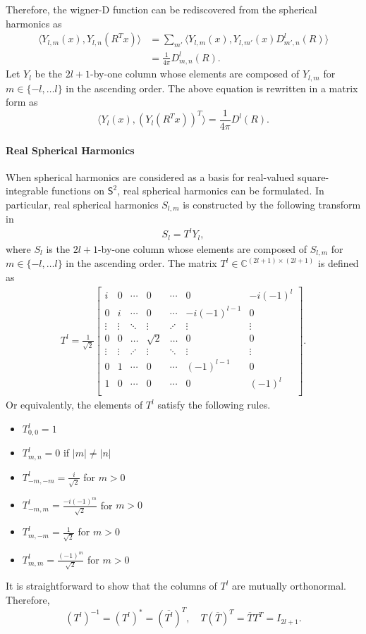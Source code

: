 \documentclass[onecolumn,11pt]{IEEEtran}
\newcommand{\pair}[1]{\ensuremath{\langle #1 \rangle}}
\newcommand{\Cp}{\ensuremath{\mathbb{C}}}
\newcommand{\Sph}{\ensuremath{\mathsf{S}}}
\begin{document}
Therefore, the wigner-D function can be rediscovered from the spherical harmonics as
\begin{align*}
    \pair{Y_{l,m}(x), Y_{l,n}(R^T x) } &= \sum_{m'} \pair{Y_{l,m}(x), Y_{l,m'}(x) D^l_{m',n}(R) }\\
    & = \frac{1}{4\pi} D^l_{m,n}(R).
\end{align*}
Let $Y_l$ be the $2l+1$-by-one column whose elements are composed of $Y_{l,m}$ for $m\in\{-l,\ldots l\}$ in the ascending order. 
The above equation is rewritten in a matrix form as
\[
    \pair{ Y_l(x), (Y_l(R^Tx))^T } = \frac{1}{4\pi} D^l(R).
\]

\paragraph{Real Spherical Harmonics}

When spherical harmonics are considered as a basis for real-valued square-integrable functions on $\Sph^2$, real spherical harmonics can be formulated. 
In particular, real spherical harmonics $S_{l,m}$ is constructed by the following transform in~\cite{BlaFloJMS97}
\begin{align}
    S_l = T^l Y_l,\label{eqn:YtoS}
\end{align}
where $S_l$ is the $2l+1$-by-one column whose elements are composed of $S_{l,m}$ for $m\in\{-l,\ldots l\}$ in the ascending order. 
The matrix $T^l\in\Cp^{(2l+1)\times(2l+1)}$ is defined as
\begin{align*}
    T^l=\frac{1}{\sqrt{2}}
    \begin{bmatrix}
        i & 0 & \cdots & 0 & \cdots & 0 & -i(-1)^l\\
        0 & i & \cdots & 0 & \cdots & -i(-1)^{l-1} & 0 \\
        \vdots & \vdots & \ddots &\vdots & \iddots & \vdots & \vdots\\
        0 & 0 & \hdots & \sqrt{2} & \hdots & 0 & 0 \\
        \vdots & \vdots & \iddots &\vdots & \ddots & \vdots & \vdots\\
        0 & 1 & \cdots & 0 & \cdots & (-1)^{l-1} & 0 \\
        1 & 0 & \cdots & 0 & \cdots & 0 & (-1)^l\\
    \end{bmatrix}.
\end{align*}
Or equivalently, the elements of $T^l$ satisfy the following rules.
\begin{itemize}
    \item $T^l_{0,0}=1$
    \item $T^l_{m,n}=0$ if $|m|\neq|n|$
    \item $T^l_{-m,-m} = \frac{i}{\sqrt{2}}$ for $m>0$
    \item $T^l_{-m,m}=\frac{-i(-1)^m}{\sqrt{2}}$ for $m>0$
    \item $T^l_{m,-m}=\frac{1}{\sqrt{2}}$ for $m>0$
    \item $T^l_{m,m}=\frac{(-1)^m}{\sqrt{2}} $ for $m>0$
\end{itemize}
It is straightforward to show that the columns of $T^l$ are mutually orthonormal. 
Therefore,
\[
    (T^l)^{-1} = (T^l)^* = (\overline{T^l})^T,\quad T (\overline T)^T= \overline{T} T^T = I_{2l+1}.
\]
\end{document}
